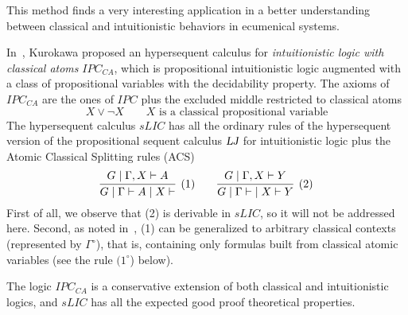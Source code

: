 
This method finds a very interesting application in a better understanding between classical and intuitionistic behaviors in ecumenical systems.

In~\cite{DBLP:journals/apal/Kurokawa09}, Kurokawa proposed an hypersequent calculus for 
{\em intuitionistic logic with classical atoms} $IPC_{CA}$, which is
propositional intuitionistic logic augmented with a class of propositional variables with  the decidability property. The axioms of $IPC_{CA}$ are the ones of $IPC$ plus the excluded middle restricted to classical atoms
\[
X\vee\neg X \qquad X \mbox{ is a classical propositional variable}
\]
The hypersequent calculus $sLIC$ has all the ordinary rules of the hypersequent version  of the propositional sequent calculus $\LJ$ for intuitionistic logic plus the Atomic Classical Splitting rules (ACS)
\[
\infer[(1)]{G\mid \Gamma\vdash A\mid X\vdash }{G\mid \Gamma, X\vdash A}\qquad
\infer[(2)]{G\mid \Gamma\vdash\; \mid X\vdash Y}{G\mid \Gamma, X\vdash Y}
\]
First of all, we observe that (2) is derivable in $sLIC$, so it will not be addressed here. Second, as noted in~\cite{DBLP:journals/apal/Kurokawa09}, (1) can be generalized to arbitrary classical contexts (represented by $\Gamma^\circ$), that is, containing only formulas built from classical atomic variables (see the rule $(1^\circ$) below).

The logic $IPC_{CA}$ is a conservative extension of both classical and intuitionistic logics, and 
$sLIC$ has all the expected good proof theoretical properties.

